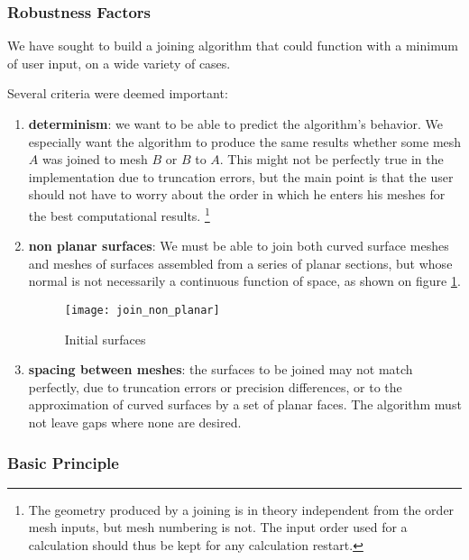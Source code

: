 \subsubsection*{Robustness Factors%
               \label{sec:join.robust}}

We have sought to build a joining algorithm that could function with
a minimum of user input, on a wide variety of cases.

Several criteria were deemed important:

\begin{enumerate}

\item {\bf determinism}: we want to be able to predict the algorithm's behavior.
We especially want the algorithm to produce the same results whether
some mesh $A$ was joined to mesh $B$ or $B$ to $A$. This might not be perfectly
true in the implementation due to truncation errors, but the main point is
that the user should not have to worry about the order in which he enters
his meshes for the best computational results.
\footnote{The geometry produced by a joining is in theory independent
from the order mesh inputs, but mesh numbering is not. The input order
used for a calculation should thus be kept for any calculation restart.}

\item {\bf non planar surfaces}: We must be able to join both curved surface
meshes and meshes of surfaces assembled from a series of planar sections,
but whose normal is not necessarily a continuous function of space,
as shown on figure \ref{fig:algo.join.non_planar}.

\begin{figure}[!h]
\centerline{
\texttt{[image: join\_non\_planar]}}
\caption{Initial surfaces}
\label{fig:algo.join.non_planar}
\end{figure}

\item {\bf spacing between meshes}: the surfaces to be joined may
not match perfectly, due to truncation errors or precision differences,
or to the approximation of curved surfaces by a set of planar faces.
The algorithm must not leave gaps where none are desired.

\end{enumerate}

\subsubsection*{Basic Principle\label{sec:join.principe}}

